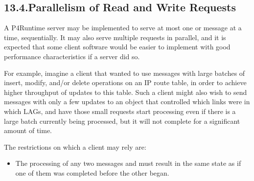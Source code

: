 \documentclass[11pt]{article}
\begin{document}
{%
\subsection{13.4.\hspace*{0.5em}Parallelism of Read and Write Requests}\label{sec-parallelism-of-read-and-write-requests}%

\noindent{}A P4Runtime server may be implemented to serve at most one
 or  message at a time, sequentially.  It
may also serve multiple requests in parallel, and it is expected that
some client software would be easier to implement with good
performance characteristics if a server did so.%

For example, imagine a client that wanted to use 
messages with large batches of insert, modify, and/or delete
operations on an IP route table, in order to achieve higher throughput
of updates to this table.  Such a client might also wish to send
 messages with only a few updates to an 
object that controlled which links were in which LAGs, and have those
small requests start processing even if there is a large
 batch currently being processed, but it will not
complete for a significant amount of time.%

The restrictions on which a client may rely are:%

\begin{itemize}[noitemsep,topsep=\mdcompacttopsep]%

\item{}The processing of any two  messages  and  must
result in the same state as if one of them was completed before the
other began.%


\end{itemize}}
\end{document}
